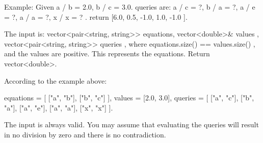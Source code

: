 Example:
Given a / b = 2.0, b / c = 3.0.
queries are: a / c = ?, b / a = ?, a / e = ?, a / a = ?, x / x = ? .
return [6.0, 0.5, -1.0, 1.0, -1.0 ].

\begin{Code}
  The input is: vector<pair<string, string>> equations, vector<double>& values
  , vector<pair<string, string>> queries , where equations.size() == values.size()
  , and the values are positive. This represents the equations. Return vector<double>.
\end{Code}

According to the example above:

\begin{Code}
equations = [ ["a", "b"], ["b", "c"] ],
values = [2.0, 3.0],
queries = [ ["a", "c"], ["b", "a"], ["a", "e"], ["a", "a"], ["x", "x"] ].
\end{Code}

The input is always valid. You may assume that evaluating the queries will result in no division by zero and there is no contradiction.

